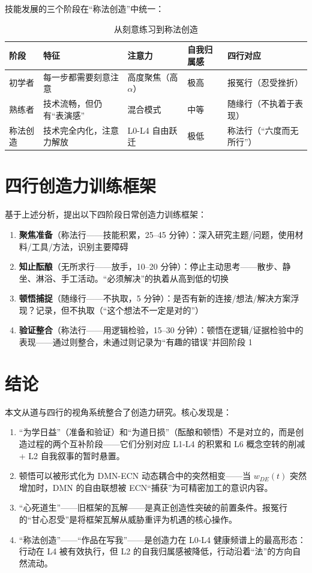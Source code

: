 \documentclass[UTF8,12pt,a4paper]{ctexart}
\begin{document}
技能发展的三个阶段在``称法创造''中统一：

\begin{table}[h]
\centering
\caption{从刻意练习到称法创造}
\begin{tabular}{p{2cm}p{3cm}p{2.5cm}p{3cm}p{2.5cm}}
\toprule
\textbf{阶段} & \textbf{特征} & \textbf{注意力} & \textbf{自我归属感} & \textbf{四行对应} \\
\midrule
初学者 & 每一步都需要刻意注意 & 高度聚焦（高 $\alpha$） & 极高 & 报冤行（忍受挫折） \\
熟练者 & 技术流畅，但仍有``表演感'' & 混合模式 & 中等 & 随缘行（不执着于表现） \\
称法创造 & 技术完全内化，注意力解放 & L0-L4 自由跃迁 & 极低 & 称法行（``六度而无所行''） \\
\bottomrule
\end{tabular}
\end{table}

\section{四行创造力训练框架}

基于上述分析，提出以下四阶段日常创造力训练框架：

\begin{enumerate}[nosep]
    \item \textbf{聚焦准备}（称法行——技能积累，25--45 分钟）：深入研究主题/问题，使用材料/工具/方法，识别主要障碍
    \item \textbf{知止酝酿}（无所求行——放手，10--20 分钟）：停止主动思考——散步、静坐、淋浴、手工活动。``必须解决''的执着从高到低的切换
    \item \textbf{顿悟捕捉}（随缘行——不执取，5 分钟）：是否有新的连接/想法/解决方案浮现？记录，但不执取（``这个想法不一定是对的''）
    \item \textbf{验证整合}（称法行——用逻辑检验，15--30 分钟）：顿悟在逻辑/证据检验中的表现——通过则整合，未通过则记录为``有趣的错误''并回阶段 1
\end{enumerate}

\section{结论}

本文从道与四行的视角系统整合了创造力研究。核心发现是：

\begin{enumerate}[nosep]
    \item ``为学日益''（准备和验证）和``为道日损''（酝酿和顿悟）不是对立的，而是创造过程的两个互补阶段——它们分别对应 L1-L4 的积累和 L6 概念空转的削减 + L2 自我叙事的暂时悬置。
    \item 顿悟可以被形式化为 DMN-ECN 动态耦合中的突然相变——当 $w_{DE}(t)$ 突然增加时，DMN 的自由联想被 ECN``捕获''为可精密加工的意识内容。
    \item ``心死道生''——旧框架的瓦解——是真正创造性突破的前置条件。报冤行的``甘心忍受''是将框架瓦解从威胁重评为机遇的核心操作。
    \item ``称法创造''——``作品在写我''——是创造力在 L0-L4 健康频谱上的最高形态：行动在 L4 被有效执行，但 L2 的自我归属感被降低，行动沿着``法''的方向自然流动。
\end{enumerate}
\end{document}
